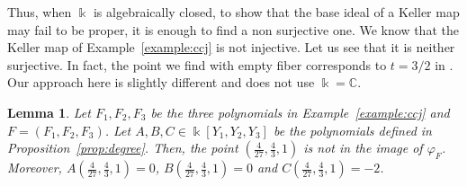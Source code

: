 \documentclass[11pt,reqno]{amsart}
\newtheorem{lemma}[theorem]{Lemma}
\theoremstyle{definition}
\newcommand{\mbk}{\mbox{$\Bbbk$}}
\newcommand{\mbc}{\mbox{$\mathbb{C}$}}
\begin{document}
Thus, when $\mbk$ is algebraically closed, to show that the base ideal 
of a Keller map may fail to be proper, it is enough to find a non surjective one. 
We know that the Keller map of Example~\ref{example:ccj} is not injective. 
Let us see that it is neither surjective. In fact, 
the point we find with empty fiber corresponds to $t=3/2$ in
\cite[Theorem~4.2]{ai}. Our approach here is slightly different and does not use $\mbk=\mbc$.

\begin{lemma}\label{lem:varphiFnoexh}
Let $F_1,F_2,F_3$ be the three polynomials in {\rm Example~\ref{example:ccj}} and $F=(F_1,F_2,F_3)$. 
Let $A,B,C\in\mbk[Y_1,Y_2,Y_3]$ be the polynomials defined in {\rm Proposition~\ref{prop:degree}}.
Then, the point $(\tfrac{4}{27},\tfrac{4}{3},1)$ is not in the image of $\varphi_F$. Moreover,
$A(\tfrac{4}{27},\tfrac{4}{3},1)=0$, $B(\tfrac{4}{27},\tfrac{4}{3},1)=0$ and $C(\tfrac{4}{27},\tfrac{4}{3},1)=-2$. 
\end{lemma}
\end{document}
